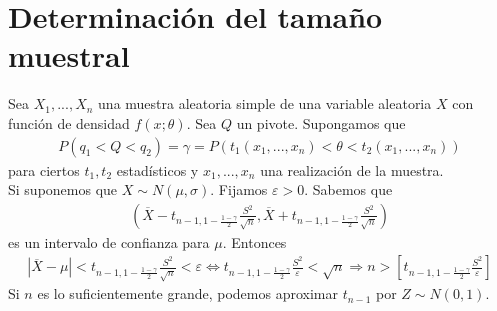 \section{Determinación del tamaño muestral}
Sea $X_1,...,X_n$ una muestra aleatoria simple de una variable aleatoria $X$ con función de densidad $f(x;\theta)$. Sea $Q$ un pivote. Supongamos que 
\begin{align*}
    P(q_1 < Q < q_2) = \gamma = P(t_1(x_1,...,x_n) < \theta < t_2(x_1,...,x_n))
\end{align*}
para ciertos $t_1,t_2$ estadísticos y $x_1,...,x_n$ una realización de la muestra.
\\
\newline
Si suponemos que $X \sim N(\mu, \sigma)$. Fijamos $\varepsilon > 0$. Sabemos que
\begin{align*}
    \left( \overline{X} - t_{n-1, 1 - \frac{1-\gamma}{2}}\frac{S^2}{\sqrt{n}},\overline{X} + t_{n-1, 1 - \frac{1-\gamma}{2}}\frac{S^2}{\sqrt{n}} \right)
\end{align*}
es un intervalo de confianza para $\mu$. Entonces
\begin{align*}
    |\overline{X} - \mu| < t_{n-1, 1 - \frac{1-\gamma}{2}}\frac{S^2}{\sqrt{n}} < \varepsilon \Longleftrightarrow  t_{n-1, 1 - \frac{1-\gamma}{2}}\frac{S^2}{\varepsilon} < \sqrt{n} \Longrightarrow n > \left[ t_{n-1, 1 - \frac{1-\gamma}{2}}\frac{S^2}{\varepsilon}\right]
\end{align*}
Si $n$ es lo suficientemente grande, podemos aproximar $t_{n-1}$ por $Z \sim N(0,1)$.

